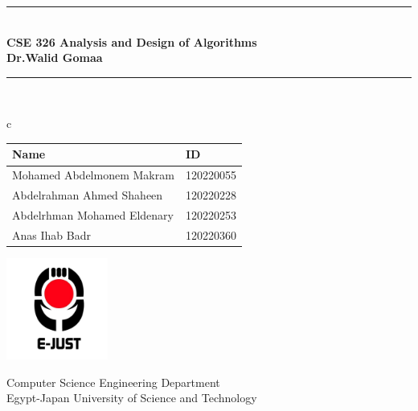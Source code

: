 \begin{titlepage}
    \begin{center}
        \vspace*{1cm}

        \rule{\linewidth}{0.2mm} \\[0.4cm]
        {\Large \textbf{CSE 326 Analysis and Design of Algorithms }}\\[0.4cm]
        \textbf{Dr.Walid Gomaa}
 
        \rule{\linewidth}{0.2mm} \\[1.5cm]

        \begin{tabular}{c}
            \begin{tabular}{ll}
                \textbf{Name} & \textbf{ID} \\
                \hline
                Mohamed Abdelmonem Makram & 120220055 \\
                \hline
                Abdelrahman Ahmed Shaheen & 120220228 \\
                \hline
                Abdelrhman Mohamed Eldenary & 120220253 \\
                \hline
                Anas Ihab  Badr & 120220360 \\
                

            \end{tabular}
        \end{tabular}

        \vspace{1cm}

        

        \vspace{5cm}

        \includegraphics[width=0.25\textwidth]{ejust.jpg}


        Computer Science Engineering Department\\
        Egypt-Japan University of Science and Technology\\

    \end{center}
\end{titlepage}


